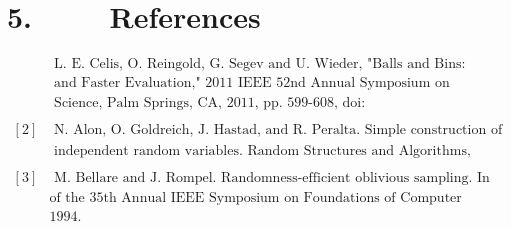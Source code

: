 \documentclass[a4paper, english]{paper}
\begin{document}
	\section{5. $\qquad$ References}
\begin{align*}
	[1]&\text{ L. E. Celis, O. Reingold, G. Segev and U. Wieder, "Balls and Bins: Smaller Hash Families}\\
	&\text{ and Faster Evaluation," 2011 IEEE 52nd Annual Symposium on Foundations of Computer }\\
	&\text{ Science, Palm Springs, CA, 2011, pp. 599-608, doi: 10.1109/FOCS.2011.49.}\\
&\\
	[2]&\text{ N. Alon, O. Goldreich, J. Hastad, and R. Peralta. Simple construction of almost kwise}\\
	&\text{ independent random variables. Random Structures and Algorithms, 3(3):289–304, 1992.}\\
&\\
	[3]&\text{ M. Bellare and J. Rompel. Randomness-efficient oblivious sampling. In Proceedings} \\
	&\text{of the 35th Annual IEEE Symposium on Foundations of Computer Science, pages 276–287,}\\
	&\text{1994.}
\end{align*}
\end{document}
